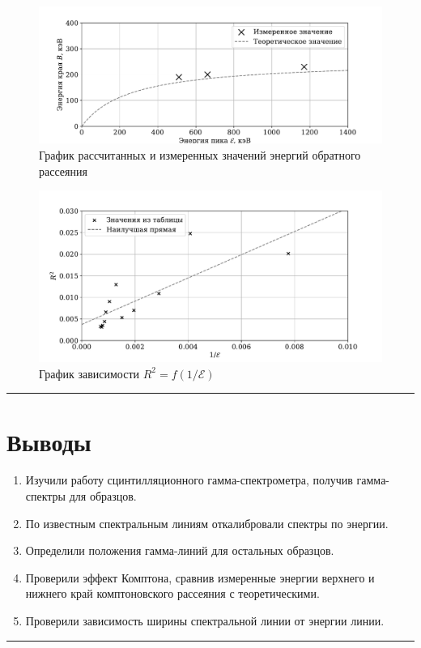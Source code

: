 \documentclass[a4paper,12pt]{article} %
\begin{document}
\begin{figure}
\centering
\includegraphics[width=\textwidth]{compton_back.pdf}
\caption{\centering График рассчитанных и измеренных значений энергий обратного рассеяния}
\label{fig:compton_back}
\end{figure}

\begin{figure}
\centering
\includegraphics[width=\textwidth]{resolution.pdf}
\caption{График зависимости $R^2 = f(1/\mathcal{E})$ }
\label{fig:resolution}
\end{figure}

\medskip\hrule\medskip

\section{Выводы}

\begin{enumerate}
\item Изучили работу сцинтилляционного гамма-спектрометра, получив гамма-спектры для образцов.
\item По известным спектральным линиям откалибровали спектры по энергии.
\item Определили положения гамма-линий для остальных образцов.
\item Проверили эффект Комптона, сравнив измеренные энергии верхнего и нижнего край комптоновского рассеяния с теоретическими.
\item Проверили зависимость ширины спектральной линии от энергии линии.
\end{enumerate}

\medskip\hrule\medskip
\end{document}
